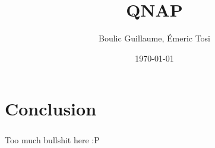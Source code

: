 \documentclass[a4paper,12pt]{report}
\title{QNAP}
\author{Boulic Guillaume, Émeric Tosi}
\date{\today}
\begin{document}
%
    \maketitle{}
%
    \setcounter{tocdepth}{1} %
    \renewcommand{\contentsname}{Sommaire} %
    \tableofcontents{} %
%
    \clearpage
%
%
%
%

\clearpage
%
%

\clearpage
%
%
\chapter*{Conclusion}
        \paragraph{}
Too much bullshit here :P
    \clearpage
%
%

\clearpage
%
%
%
\end{document}
